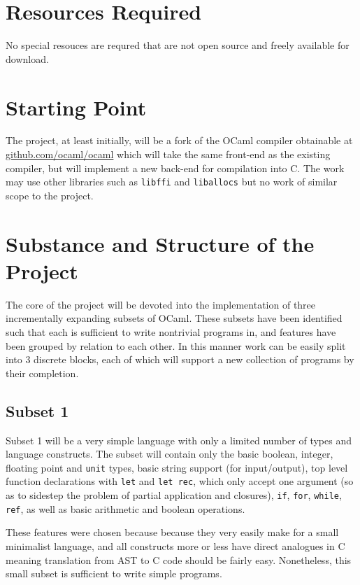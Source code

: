 \section*{Resources Required}

No special resouces are requred that are not open source and freely available
for download.

\section*{Starting Point}

The project, at least initially, will be a fork of the OCaml compiler
obtainable at \url{github.com/ocaml/ocaml} which will take the same front-end
as the existing compiler, but will implement a new back-end for compilation
into C. The work may use other libraries such as \texttt{libffi} and
\texttt{liballocs} but no work of similar scope to the project.

\section*{Substance and Structure of the Project}

The core of the project will be devoted into the implementation of three
incrementally expanding subsets of OCaml. These subsets have been identified
such that each is sufficient to write nontrivial programs in, and features have
been grouped by relation to each other. In this manner work can be easily split
into 3 discrete blocks, each of which will support a new collection of
programs by their completion.

\subsection*{Subset 1}

Subset 1 will be a very simple language with only a limited number of types and
language constructs. The subset will contain only the basic boolean, integer,
floating point and \texttt{unit} types, basic string support (for
input/output), top level function declarations with \texttt{let} and
\texttt{let rec}, which only accept one argument (so as to sidestep the problem
of partial application and closures), \texttt{if}, \texttt{for},
\texttt{while}, \texttt{ref}, as well as basic arithmetic and boolean
operations.

These features were chosen because because they very easily make for a small
minimalist language, and all constructs more or less have direct analogues in C
meaning translation from AST to C code should be fairly easy. Nonetheless, this
small subset is sufficient to write simple programs.

